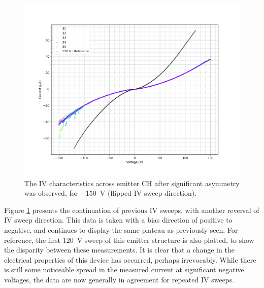 \begin{refsection}
\begin{figure}[H]
    \centering
    \includegraphics[width=\linewidth]{Chapter7/Figs/Raster/Emitters/160-164_iv.png}
    \caption{The IV characteristics across emitter CH after significant asymmetry was observed, for $\pm$150~\si{\volt} (flipped IV sweep direction).}
    \label{fig:e_ch_160-164_iv}
\end{figure}

Figure \ref{fig:e_ch_160-164_iv} presents the continuation of previous IV sweeps, with another reversal of IV sweep direction. This data is taken with a bias direction of positive to negative, and continues to display the same plateau as previously seen. For reference, the first 120~\si{\volt} sweep of this emitter structure is also plotted, to show the disparity between these measurements. It is clear that a change in the electrical properties of this device has occurred, perhaps irrevocably. While there is still some noticeable spread in the measured current at significant negative voltages, the data are now generally in agreement for repeated IV sweeps.


\end{refsection}
